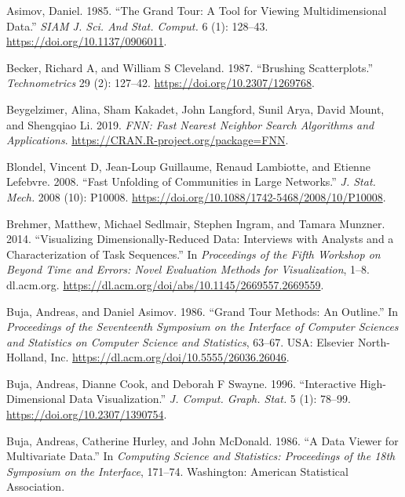 \documentclass[article,notitle]{jdssv}
\begin{document}
\leavevmode\hypertarget{ref-Asimov1985-vp}{}%
Asimov, Daniel. 1985. ``The Grand Tour: A Tool for Viewing Multidimensional Data.'' \emph{SIAM J. Sci. And Stat. Comput.} 6 (1): 128--43. \url{https://doi.org/10.1137/0906011}.

\leavevmode\hypertarget{ref-Becker1987-gd}{}%
Becker, Richard A, and William S Cleveland. 1987. ``Brushing Scatterplots.'' \emph{Technometrics} 29 (2): 127--42. \url{https://doi.org/10.2307/1269768}.

\leavevmode\hypertarget{ref-fnn-pkg}{}%
Beygelzimer, Alina, Sham Kakadet, John Langford, Sunil Arya, David Mount, and Shengqiao Li. 2019. \emph{FNN: Fast Nearest Neighbor Search Algorithms and Applications}. \url{https://CRAN.R-project.org/package=FNN}.

\leavevmode\hypertarget{ref-Blondel2008-bx}{}%
Blondel, Vincent D, Jean-Loup Guillaume, Renaud Lambiotte, and Etienne Lefebvre. 2008. ``Fast Unfolding of Communities in Large Networks.'' \emph{J. Stat. Mech.} 2008 (10): P10008. \url{https://doi.org/10.1088/1742-5468/2008/10/P10008}.

\leavevmode\hypertarget{ref-Brehmer2014-hk}{}%
Brehmer, Matthew, Michael Sedlmair, Stephen Ingram, and Tamara Munzner. 2014. ``Visualizing Dimensionally-Reduced Data: Interviews with Analysts and a Characterization of Task Sequences.'' In \emph{Proceedings of the Fifth Workshop on Beyond Time and Errors: Novel Evaluation Methods for Visualization}, 1--8. dl.acm.org. \url{https://dl.acm.org/doi/abs/10.1145/2669557.2669559}.

\leavevmode\hypertarget{ref-Buja1986-zr}{}%
Buja, Andreas, and Daniel Asimov. 1986. ``Grand Tour Methods: An Outline.'' In \emph{Proceedings of the Seventeenth Symposium on the Interface of Computer Sciences and Statistics on Computer Science and Statistics}, 63--67. USA: Elsevier North-Holland, Inc. \url{https://dl.acm.org/doi/10.5555/26036.26046}.

\leavevmode\hypertarget{ref-Buja1996-fk}{}%
Buja, Andreas, Dianne Cook, and Deborah F Swayne. 1996. ``Interactive High-Dimensional Data Visualization.'' \emph{J. Comput. Graph. Stat.} 5 (1): 78--99. \url{https://doi.org/10.2307/1390754}.

\leavevmode\hypertarget{ref-Buja1986-ku}{}%
Buja, Andreas, Catherine Hurley, and John McDonald. 1986. ``A Data Viewer for Multivariate Data.'' In \emph{Computing Science and Statistics: Proceedings of the 18th Symposium on the Interface}, 171--74. Washington: American Statistical Association.
\end{document}
